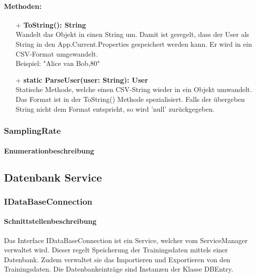 \documentclass[a4paper,12pt]{article}
\begin{document}
	\paragraph{Methoden:}
	\begin{itemize}
		\item[+] \textbf{ToString(): String}\\Wandelt das Objekt in einen String um. Damit ist geregelt, dass der User als String in den App.Current.Properties gespeichert werden kann. Er wird in ein \Gls{CSV}-Format umgewandelt.\\
		Beispiel: "Alice van Bob,80"\\
		\item[+] \textbf{static ParseUser(user: String): User}\\Statische Methode, welche einen \Gls{CSV}-String wieder in  ein Objekt umwandelt. Das Format ist in der ToString() Methode spezialisiert. Falls der übergeben String nicht dem Format entspricht, so wird 'null' zurückgegeben.\\
	\end{itemize}

\subsubsection{SamplingRate}
	\paragraph{Enumerationbeschreibung}

	
	
	
	
	
	
	
\subsection{Datenbank Service}
\subsubsection{IDataBaseConnection}
	\paragraph{Schnittstellenbeschreibung}
	Das Interface IDataBaseConnection ist ein Service, welcher vom ServiceManager verwaltet wird. Dieser regelt Speicherung der Trainingsdaten mittels einer \gls{Datenbank}. Zudem verwaltet sie das Importieren und Exportieren von den Trainingsdaten.
	Die Datenbankeinträge sind Instanzen der Klasse DBEntry. 
	
\end{document}
